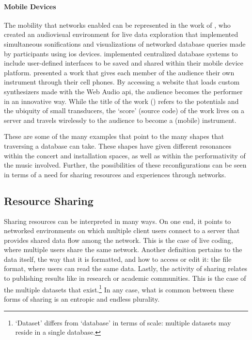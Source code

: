 \documentclass[
]{book}
\begin{document}
\paragraph{Mobile Devices}
The mobility that networks enabled can be represented in the work of 
\textcite{Liu:2013}, who created an audiovisual environment for live data exploration that implemented simultaneous sonifications and visualizations of networked database queries made by participants using \gls{ios} devices. \textcite{btaylor:2014} implemented centralized database systems to include user-defined interfaces to be saved and shared within their mobile device platform. \textcite{Rya17:OnT} presented a work that gives each member of the audience their own instrument through their cell phones. By accessing a website that loads custom synthesizers made with the Web Audio \gls{api}, the audience becomes the performer in an innovative way. While the title of the work () refers to the potentials and the ubiquity of small transducers, the `score' (source code) of the work lives on a server and travels wirelessly to the audience to become a (mobile) instrument.

These are some of the many examples that point to the many shapes that traversing a database can take. These shapes have given different resonances within the concert and installation spaces, as well as within the performativity of the music involved. Further, the possibilities of these reconfigurations can be seen in terms of a need for sharing resources and experiences through networks.

\subsection{Resource Sharing}

Sharing resources can be interpreted in many ways. On one end, it points to networked environments on which multiple client users connect to a server that provides shared data flow among the network. This is the case of live coding, where multiple users share the same network. Another definition pertains to the data itself, the way that it is formatted, and how to access or edit it: the file format, where users can read the same data. Lastly, the activity of sharing relates to publishing results like in research or academic communities. This is the case of the multiple datasets that exist.\footnote{`Dataset' differs from `database' in terms of scale: multiple datasets may reside in a single database.} In any case, what is common between these forms of sharing is an entropic and endless plurality.
\end{document}
